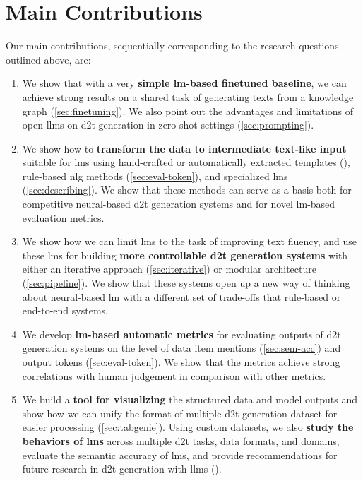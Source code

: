 \section{Main Contributions}
\label{sec:contributions}


Our main contributions, sequentially corresponding to the research questions outlined above, are:
\begin{enumerate}
    \item We show that with a very \textbf{simple \ac{lm}-based finetuned baseline}, we can achieve strong results on a shared task of generating texts from a knowledge graph (\autoref{sec:finetuning}). We also point out the advantages and limitations of open \acp{llm} on \ac{d2t} generation in zero-shot settings (\autoref{sec:prompting}).
    \item We show how to \textbf{transform the data to intermediate text-like input} suitable for \acp{lm} using hand-crafted or automatically extracted templates (), rule-based \ac{nlg} methods (\autoref{sec:eval-token}), and specialized \acp{lm} (\autoref{sec:describing}). We show that these methods can serve as a basis both for competitive neural-based \ac{d2t} generation systems and for novel \ac{lm}-based evaluation metrics.
    \item We show how we can limit \acp{lm} to the task of improving text fluency, and use these \acp{lm} for building \textbf{more controllable \ac{d2t} generation systems} with either an iterative approach (\autoref{sec:iterative}) or modular architecture (\autoref{sec:pipeline}). We show that these systems open up a new way of thinking about neural-based \ac{lm} with a different set of trade-offs that rule-based or end-to-end systems.
    \item We develop \textbf{\ac{lm}-based automatic metrics} for evaluating outputs of \ac{d2t} generation systems on the level of data item mentions (\autoref{sec:sem-acc}) and output tokens (\autoref{sec:eval-token}). We show that the metrics achieve strong correlations with human judgement in comparison with other metrics.
    \item We build a \textbf{tool for visualizing} the structured data and model outputs and show how we can unify the format of multiple \ac{d2t} generation dataset for easier processing (\autoref{sec:tabgenie}). Using custom datasets, we also \textbf{study the behaviors of \acp{lm}} across multiple \ac{d2t} tasks, data formats, and domains, evaluate the semantic accuracy of \acp{lm}, and provide recommendations for future research in \ac{d2t} generation with \acp{llm} ().
\end{enumerate}



